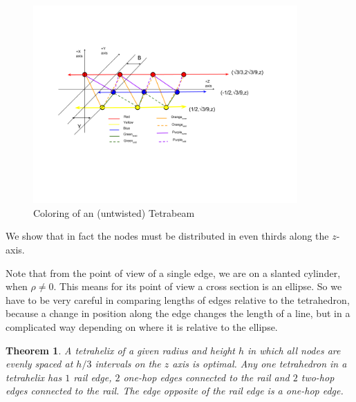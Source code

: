 \documentclass[11pt]{article}
\newtheorem{theorem}{Theorem}
\begin{document}
 \begin{figure}[H]
     \centering
     \includegraphics[width=0.9\textwidth]{figures/TetrahelixColoringDiagram.png}
     \caption{Coloring of an (untwisted) Tetrabeam}
 \end{figure}

 We show that in fact the nodes must be distributed in even thirds along the $z$-axis.

 Note that from the point of view of a single edge, we are on a slanted cylinder, when $\rho \neq 0$.
 This means for its point of view a cross section is an ellipse. So we have to be very careful in
 comparing lengths of edges relative to the tetrahedron, because a change in position along the edge
 changes the length of a line, but in a complicated way depending on where it is relative to the ellipse.

 \begin{theorem}
   \label{eventhirds}
   A tetrahelix of a given radius and height $h$ in which all nodes are evenly spaced at $h/3$ intervals on the $z$ axis is optimal.
     Any one tetrahedron in a tetrahelix has $1$ rail edge, $2$ one-hop edges connected to the rail and $2$ two-hop edges connected to the rail.
  The edge opposite of the rail edge is a one-hop edge.
  \end{theorem}
\end{document}

